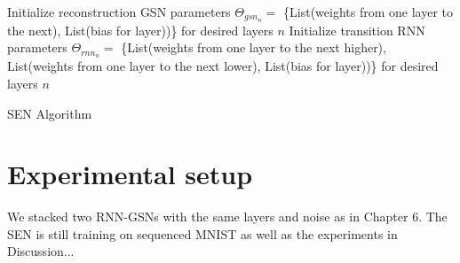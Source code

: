  \begin{algorithm}[h!]
	Initialize reconstruction GSN parameters \(\Theta_{gsn_n} = \) \{List(weights from one layer to the next), List(bias for layer))\} for desired layers \(n\)\;
	Initialize transition RNN parameters \(\Theta_{rnn_n} = \) \{List(weights from one layer to the next higher), List(weights from one layer to the next lower), List(bias for layer))\} for desired layers \(n\)\;
	\caption{ SEN Algorithm }
\end{algorithm}

\section{Experimental setup}

We stacked two RNN-GSNs with the same layers and noise as in Chapter 6. The SEN is still training on sequenced MNIST as well as the experiments in Discussion...
